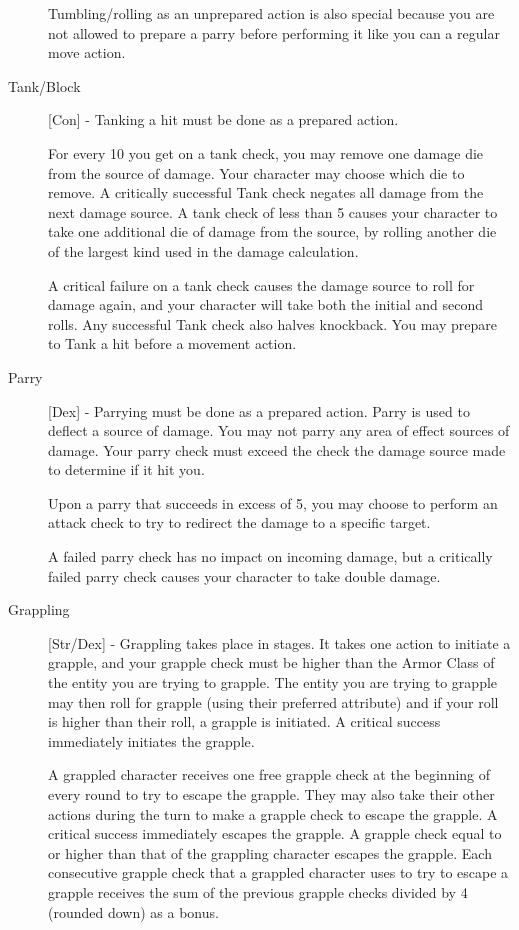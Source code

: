 \begin{description}
Tumbling/rolling as an unprepared action is also special because you are not allowed to prepare a parry before performing it like you can a regular move action.
\item[Tank/Block] [Con] - Tanking a hit must be done as a prepared action.

For every 10 you get on a tank check, you may remove one damage die from the source of damage. Your character may choose which die to remove. A critically successful Tank check negates all damage from the next damage source. A tank check of less than 5 causes your character to take one additional die of damage from the source, by rolling another die of the largest kind used in the damage calculation.

A critical failure on a tank check causes the damage source to roll for damage again, and your character will take both the initial and second rolls. Any successful Tank check also halves knockback. You may prepare to Tank a hit before a movement action.
\item[Parry] [Dex] - Parrying must be done as a prepared action. Parry is used to deflect a source of damage. You may not parry any area of effect sources of damage. Your parry check must exceed the check the damage source made to determine if it hit you.

Upon a parry that succeeds in excess of 5, you may choose to perform an attack check to try to redirect the damage to a specific target.

A failed parry check has no impact on incoming damage, but a critically failed parry check causes your character to take double damage.
\item[Grappling] [Str/Dex] - Grappling takes place in stages. It takes one action to initiate a grapple, and your grapple check must be higher than the Armor Class of the entity you are trying to grapple. The entity you are trying to grapple may then roll for grapple (using their preferred attribute) and if your roll is higher than their roll, a grapple is initiated. A critical success immediately initiates the grapple.

A grappled character receives one free grapple check at the beginning of every round to try to escape the grapple. They may also take their other actions during the turn to make a grapple check to escape the grapple. A critical success immediately escapes the grapple. A grapple check equal to or higher than that of the grappling character escapes the grapple. Each consecutive grapple check that a grappled character uses to try to escape a grapple receives the sum of the previous grapple checks divided by 4 (rounded down) as a bonus.


\end{description}
